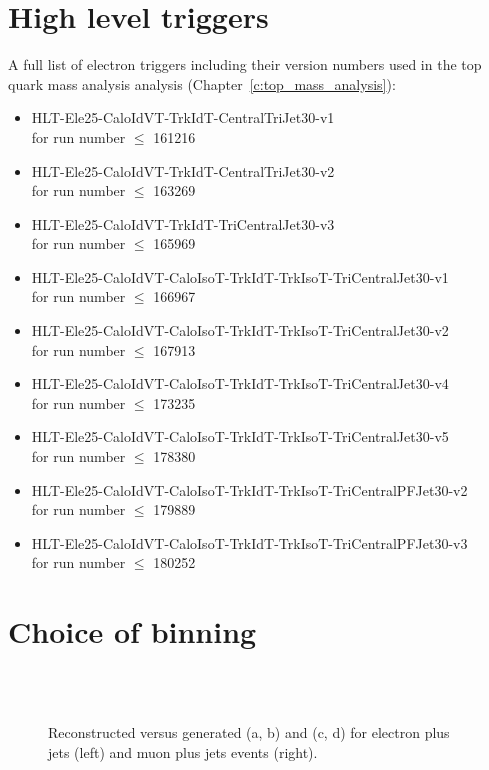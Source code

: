 
\chapter{High level triggers}
\label{a:full_trigger_list}
 
A full list of electron triggers including their version numbers used in the top quark mass analysis analysis
(Chapter~\ref{c:top_mass_analysis}):
\begin{itemize}
 \item HLT-Ele25-CaloIdVT-TrkIdT-CentralTriJet30-v1 \\for run number $\leq$ 161216
 \item HLT-Ele25-CaloIdVT-TrkIdT-CentralTriJet30-v2 \\for run number $\leq$ 163269
 \item HLT-Ele25-CaloIdVT-TrkIdT-TriCentralJet30-v3 \\for run number $\leq$ 165969
 \item HLT-Ele25-CaloIdVT-CaloIsoT-TrkIdT-TrkIsoT-TriCentralJet30-v1 \\for run number $\leq$ 166967
 \item HLT-Ele25-CaloIdVT-CaloIsoT-TrkIdT-TrkIsoT-TriCentralJet30-v2 \\for run number $\leq$ 167913
 \item HLT-Ele25-CaloIdVT-CaloIsoT-TrkIdT-TrkIsoT-TriCentralJet30-v4 \\for run number $\leq$ 173235
 \item HLT-Ele25-CaloIdVT-CaloIsoT-TrkIdT-TrkIsoT-TriCentralJet30-v5 \\for run number $\leq$ 178380
 \item \small{HLT-Ele25-CaloIdVT-CaloIsoT-TrkIdT-TrkIsoT-TriCentralPFJet30-v2 \\for run number $\leq$ 179889}
 \item HLT-Ele25-CaloIdVT-CaloIsoT-TrkIdT-TrkIsoT-TriCentralPFJet30-v3 \\for run number $\leq$ 180252
\end{itemize}

\chapter{Choice of binning}
\label{a:binning}

\begin{figure}[hbtp]
	\centering
	\hfill
	\\ 
	\hfill
	\\ 
	\caption{Reconstructed versus generated \HT (a, b) and \ST (c, d) for electron plus jets (left) and muon plus jets
	events (right).}
	\label{fig:choice_of_bins_appendix_1}
 \end{figure}

